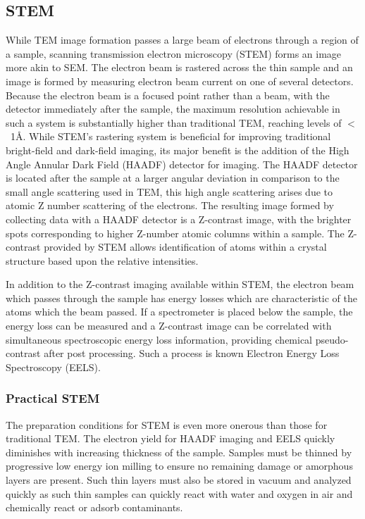 \subsection{STEM}
While TEM image formation passes a large beam of electrons through a region of a sample, scanning transmission electron microscopy (STEM) forms an image more akin to SEM\@.
The electron beam is rastered across the thin sample and an image is formed by measuring electron beam current on one of several detectors.
Because the electron beam is a focused point rather than a beam, with the detector immediately after the sample, the maximum resolution achievable in such a system is substantially higher than traditional TEM, reaching levels of \(<\)~1\AA{}.
While STEM's rastering system is beneficial for improving traditional bright-field and dark-field imaging, its major benefit is the addition of the High Angle Annular Dark Field (HAADF) detector for imaging.
The HAADF detector is located after the sample at a larger angular deviation in comparison to the small angle scattering used in TEM, this high angle scattering arises due to atomic Z number scattering of the electrons.
The resulting image formed by collecting data with a HAADF detector is a Z-contrast image, with the brighter spots corresponding to higher Z-number atomic columns within a sample.
The Z-contrast provided by STEM allows identification of atoms within a crystal structure based upon the relative intensities.

In addition to the Z-contrast imaging available within STEM, the electron beam which passes through the sample has energy losses which are characteristic of the atoms which the beam passed.
If a spectrometer is placed below the sample, the energy loss can be measured and a Z-contrast image can be correlated with simultaneous spectroscopic energy loss information, providing chemical pseudo-contrast after post processing.
Such a process is known Electron Energy Loss Spectroscopy (EELS).

\subsubsection{Practical STEM} 
The preparation conditions for STEM is even more onerous than those for traditional TEM\@.
The electron yield for HAADF imaging and EELS quickly diminishes with increasing thickness of the sample.
Samples must be thinned by progressive low energy ion milling to ensure no remaining damage or amorphous layers are present.
Such thin layers must also be stored in vacuum and analyzed quickly as such thin samples can quickly react with water and oxygen in air and chemically react or adsorb contaminants.

